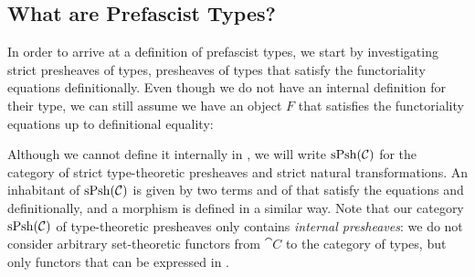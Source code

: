 \subsection{What are Prefascist Types?}

In order to arrive at a definition of prefascist types, we start by 
investigating strict presheaves of types, \ie presheaves of types that satisfy 
the functoriality equations definitionally. 
% 
Even though we do not have an internal definition for their type, we can still 
assume we have an object \( F \) that satisfies the functoriality equations up 
to definitional equality:


Although we cannot define it internally in \MLTT, we will write 
\( \mathrm{sPsh}(\mathcal{C}) \) for the category of strict type-theoretic presheaves
and strict natural transformations.
An inhabitant of \( \mathrm{sPsh}(\mathcal{C}) \) is given by two terms 
 and  of \MLTT that satisfy the equations  and 
 definitionally, and a morphism is defined in a similar way.
Note that our category \( \mathrm{sPsh}(\mathcal{C}) \) of type-theoretic presheaves 
only contains \emph{internal presheaves}: we do not consider arbitrary 
set-theoretic functors from \( \cat{C} \) to the
category of types, but only functors that can be expressed in \MLTT.

